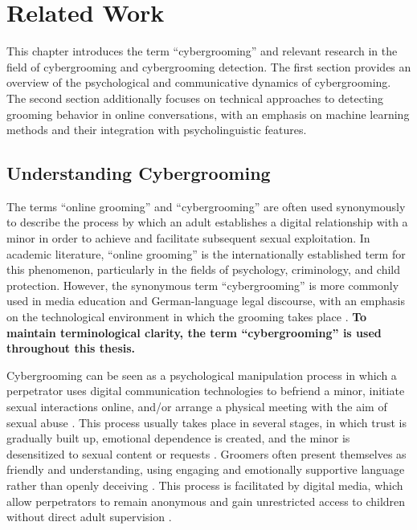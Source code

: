 \chapter{Related Work}

This chapter introduces the term “cybergrooming” and relevant research in the field of cybergrooming and cybergrooming detection. The first section provides an overview of the psychological and communicative dynamics of cybergrooming. The second section additionally focuses on technical approaches to detecting grooming behavior in online conversations, with an emphasis on machine learning methods and their integration with psycholinguistic features.


\section{Understanding Cybergrooming}


The terms “online grooming” and “cybergrooming” are often used synonymously to describe the process by which an adult establishes a digital relationship with a minor in order to achieve and facilitate subsequent sexual exploitation. In academic literature, “online grooming” is the internationally established term for this phenomenon, particularly in the fields of psychology, criminology, and child protection. However, the synonymous term “cybergrooming” is more commonly used in media education and German-language legal discourse, with an emphasis on the technological environment in which the grooming takes place \parencite{mladenovic2021cyber, schittenhelm2024cybergrooming}. \textbf{To maintain terminological clarity, the term “cybergrooming” is used throughout this thesis. } %

Cybergrooming can be seen as a psychological manipulation process in which a perpetrator uses digital communication technologies to befriend a minor, initiate sexual interactions online, and/or arrange a physical meeting with the aim of sexual abuse \parencite{webster2021european}. This process usually takes place in several stages, in which trust is gradually built up, emotional dependence is created, and the minor is desensitized to sexual content or requests \parencite{whittle2013review}. Groomers often present themselves as friendly and understanding, using engaging and emotionally supportive language rather than openly deceiving \parencite{broome2020psycholinguistic}. This process is facilitated by digital media, which allow perpetrators to remain anonymous and gain unrestricted access to children without direct adult supervision \parencite{mladenovic2021cyber}. %



